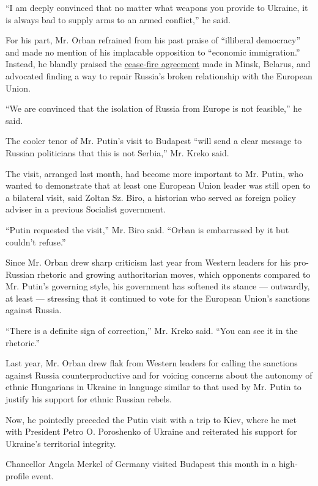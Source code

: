 ``I am deeply convinced that no matter what weapons you provide to
Ukraine, it is always bad to supply arms to an armed conflict,'' he
said.

For his part, Mr. Orban refrained from his past praise of ``illiberal
democracy'' and made no mention of his implacable opposition to
``economic immigration.'' Instead, he blandly praised the
\href{http://www.nytimes.com/reuters/2015/02/12/world/europe/12reuters-ukraine-crisis-minsk-agreement-factbox.html}{cease-fire
agreement} made in Minsk, Belarus, and advocated finding a way to repair
Russia's broken relationship with the European Union.

``We are convinced that the isolation of Russia from Europe is not
feasible,'' he said.

The cooler tenor of Mr. Putin's visit to Budapest ``will send a clear
message to Russian politicians that this is not Serbia,'' Mr. Kreko
said.

The visit, arranged last month, had become more important to Mr. Putin,
who wanted to demonstrate that at least one European Union leader was
still open to a bilateral visit, said Zoltan Sz. Biro, a historian who
served as foreign policy adviser in a previous Socialist government.

``Putin requested the visit,'' Mr. Biro said. ``Orban is embarrassed by
it but couldn't refuse.''

Since Mr. Orban drew sharp criticism last year from Western leaders for
his pro-Russian rhetoric and growing authoritarian moves, which
opponents compared to Mr. Putin's governing style, his government has
softened its stance --- outwardly, at least --- stressing that it
continued to vote for the European Union's sanctions against Russia.

``There is a definite sign of correction,'' Mr. Kreko said. ``You can
see it in the rhetoric.''

Last year, Mr. Orban drew flak from Western leaders for calling the
sanctions against Russia counterproductive and for voicing concerns
about the autonomy of ethnic Hungarians in Ukraine in language similar
to that used by Mr. Putin to justify his support for ethnic Russian
rebels.

Now, he pointedly preceded the Putin visit with a trip to Kiev, where he
met with President Petro O. Poroshenko of Ukraine and reiterated his
support for Ukraine's territorial integrity.

Chancellor Angela Merkel of Germany visited Budapest this month in a
high-profile event.

